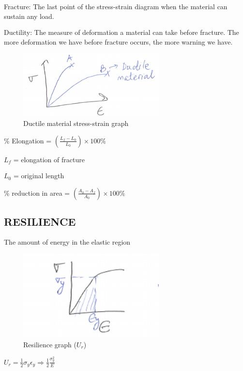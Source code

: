\documentclass{article}
\begin{document}
Fracture: The last point of the stress-strain diagram when the material can sustain any load.

Ductility: The measure of deformation a material can take before fracture. The more deformation we have before fracture occurs, the more warning we have.

\begin{figure}[h!]
	\centering
	\includegraphics[width=0.66\textwidth]{assets/2160dc14.png}
	\caption{Ductile material stress-strain graph}
\end{figure}

\% Elongation = $(\frac{L_f - L_0}{L_0})\times 100\%$

$L_f$ = elongation of fracture

$L_0$ = original length

\% reduction in area = $(\frac{A_0 - A_f}{A_0})\times 100\% $

\subsection{RESILIENCE}
The amount of energy in the elastic region

\begin{figure}[H]
	\centering
	\includegraphics[width=0.66\textwidth]{assets/9cb7c396.png}
	\caption{Resilience graph ($U_r$)}
\end{figure}
$U_r = \frac{1}{2}\sigma_y\epsilon_y \Rightarrow \frac{1}{2} \frac{\sigma_y^2}{E}$
\end{document}
